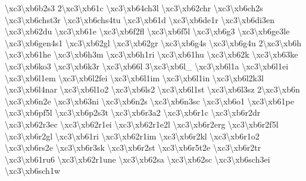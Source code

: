 \begin{DoxyCompactItemize}
\textbackslash{}xc3\textbackslash{}xb6b2s3 2\textbackslash{}xc3\textbackslash{}xb61c \textbackslash{}xc3\textbackslash{}xb64ch3l \textbackslash{}xc3\textbackslash{}xb62chr \textbackslash{}xc3\textbackslash{}xb6ch2s \textbackslash{}xc3\textbackslash{}xb6chst3r \textbackslash{}xc3\textbackslash{}xb6chs4tu \textbackslash{}xc3\textbackslash{}xb61d \textbackslash{}xc3\textbackslash{}xb6de1r \textbackslash{}xc3\textbackslash{}xb6di3en \textbackslash{}xc3\textbackslash{}xb62du \textbackslash{}xc3\textbackslash{}xb61e \textbackslash{}xc3\textbackslash{}xb6f2fl \textbackslash{}xc3\textbackslash{}xb6f5l \textbackslash{}xc3\textbackslash{}xb6g3 \textbackslash{}xc3\textbackslash{}xb6ge3le \textbackslash{}xc3\textbackslash{}xb6gen4s1 \textbackslash{}xc3\textbackslash{}xb62gl \textbackslash{}xc3\textbackslash{}xb62gr \textbackslash{}xc3\textbackslash{}xb6g4s \textbackslash{}xc3\textbackslash{}xb6g4u 2\textbackslash{}xc3\textbackslash{}xb6h \textbackslash{}xc3\textbackslash{}xb61he \textbackslash{}xc3\textbackslash{}xb6h3m \textbackslash{}xc3\textbackslash{}xb6h1ri \textbackslash{}xc3\textbackslash{}xb61hu \textbackslash{}xc3\textbackslash{}xb62k \textbackslash{}xc3\textbackslash{}xb63ke \textbackslash{}xc3\textbackslash{}xb6ko3 \textbackslash{}xc3\textbackslash{}xb6k3r \textbackslash{}xc3\textbackslash{}xb66l 3\textbackslash{}xc3\textbackslash{}xb6l\-\_\- \textbackslash{}xc3\textbackslash{}xb6l1a \textbackslash{}xc3\textbackslash{}xb6l1ei \textbackslash{}xc3\textbackslash{}xb6l1em \textbackslash{}xc3\textbackslash{}xb6l2fei \textbackslash{}xc3\textbackslash{}xb6l1im \textbackslash{}xc3\textbackslash{}xb6l1in \textbackslash{}xc3\textbackslash{}xb6l2k3l \textbackslash{}xc3\textbackslash{}xb6l4nar \textbackslash{}xc3\textbackslash{}xb6l1o2 \textbackslash{}xc3\textbackslash{}xb6ls2 \textbackslash{}xc3\textbackslash{}xb6l1st \textbackslash{}xc3\textbackslash{}xb6l3sz 2\textbackslash{}xc3\textbackslash{}xb6n \textbackslash{}xc3\textbackslash{}xb6n2e \textbackslash{}xc3\textbackslash{}xb63ni \textbackslash{}xc3\textbackslash{}xb6n2s \textbackslash{}xc3\textbackslash{}xb6n3sc \textbackslash{}xc3\textbackslash{}xb6o1 \textbackslash{}xc3\textbackslash{}xb61pe \textbackslash{}xc3\textbackslash{}xb6pf5l \textbackslash{}xc3\textbackslash{}xb6p2s3t \textbackslash{}xc3\textbackslash{}xb6r3a2 \textbackslash{}xc3\textbackslash{}xb6r1c \textbackslash{}xc3\textbackslash{}xb6r2dr \textbackslash{}xc3\textbackslash{}xb62r3ec \textbackslash{}xc3\textbackslash{}xb62r1ei \textbackslash{}xc3\textbackslash{}xb62r1e2l \textbackslash{}xc3\textbackslash{}xb6r2erg \textbackslash{}xc3\textbackslash{}xb6r2f5l \textbackslash{}xc3\textbackslash{}xb6r2gl \textbackslash{}xc3\textbackslash{}xb61ri \textbackslash{}xc3\textbackslash{}xb62r1im \textbackslash{}xc3\textbackslash{}xb6r2kl \textbackslash{}xc3\textbackslash{}xb6r1o2 \textbackslash{}xc3\textbackslash{}xb6rs2e \textbackslash{}xc3\textbackslash{}xb6r3sk \textbackslash{}xc3\textbackslash{}xb6r2st \textbackslash{}xc3\textbackslash{}xb6r5t2e \textbackslash{}xc3\textbackslash{}xb6r2tr \textbackslash{}xc3\textbackslash{}xb61ru6 \textbackslash{}xc3\textbackslash{}xb62r1une \textbackslash{}xc3\textbackslash{}xb62sa \textbackslash{}xc3\textbackslash{}xb62sc \textbackslash{}xc3\textbackslash{}xb6sch3ei \textbackslash{}xc3\textbackslash{}xb6sch1w 
\end{DoxyCompactItemize}
